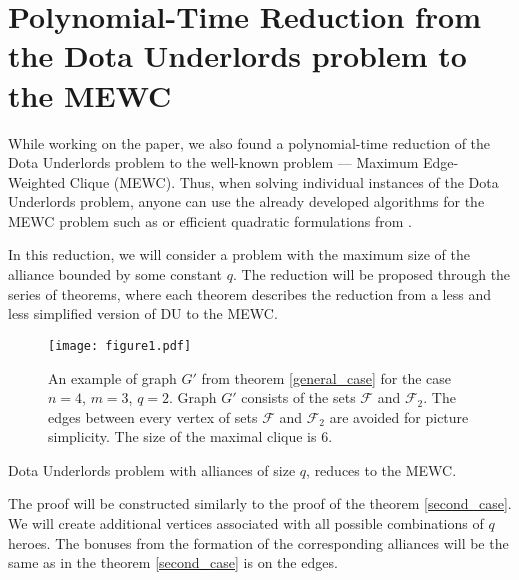 \documentclass[smallextended]{svjour3}       %
\begin{document}
\section{Polynomial-Time Reduction from the Dota Underlords problem to the MEWC}
While working on the paper, we also found a polynomial-time reduction of the Dota Underlords problem to the well-known problem --- Maximum Edge-Weighted Clique (MEWC). Thus, when solving individual instances of the Dota Underlords problem, anyone can use the already developed algorithms for the MEWC problem such as \cite{san2019new} or efficient quadratic formulations from \cite{hosseinian2017maximum}.

In this reduction, we will consider a problem with the maximum size of the alliance bounded by some constant $q$. The reduction will be proposed through the series of theorems, where each theorem describes the reduction from a less and less simplified version of DU to the MEWC.


\begin{figure}[h!]
\begin{center}
\texttt{[image: figure1.pdf]}
\caption{An example of graph $G'$ from theorem \ref{general_case}  for the case $n=4$, $m=3$, $q=2$.  Graph $G'$ consists of the sets $\mathcal{F}$ and $\mathcal{F}_2$. The edges between every vertex of sets $\mathcal{F}$ and $\mathcal{F}_2$ are avoided for picture simplicity. The size of the maximal clique is 6. }
\label{fig:reduction}
\end{center}
\end{figure}


\begin{theorem}
\label{general_case}
    Dota Underlords problem with alliances of size $q$, reduces to the MEWC.
\end{theorem}
	The proof will be constructed similarly to the proof of the theorem \ref {second_case}.
We will create additional vertices associated with all possible combinations of $q$ heroes. The bonuses from the formation of the corresponding alliances will be the same as in the theorem \ref {second_case} is on the edges.
\end{document}
